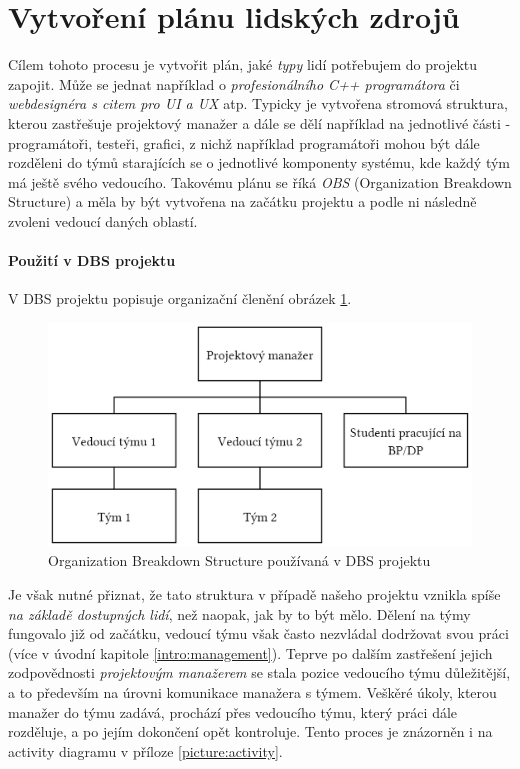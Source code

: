 
\section{Vytvoření plánu lidských zdrojů}

Cílem tohoto procesu je vytvořit plán, jaké \emph{typy} lidí potřebujem do projektu zapojit. Může se jednat například o \emph{profesionálního C++ programátora} či \emph{webdesignéra s citem pro UI a UX} atp. Typicky je vytvořena stromová struktura, kterou zastřešuje projektový manažer a dále se dělí například na jednotlivé části - programátoři, testeři, grafici, z nichž například programátoři mohou být dále rozděleni do týmů starajících se o jednotlivé komponenty systému, kde každý tým má ještě svého vedoucího. Takovému plánu se říká \emph{OBS} (Organization Breakdown Structure) a měla by být vytvořena na začátku projektu a podle ni následně zvoleni vedoucí daných oblastí.

\paragraph{Použití v DBS projektu}
V DBS projektu popisuje organizační členění obrázek \ref{picture:obs}.\\
\begin{figure}[h]
\includegraphics[width=\textwidth]{../pdf/dbs-obs.pdf}
\caption{Organization Breakdown Structure používaná v DBS projektu} \label{picture:obs}
\end{figure}
Je však nutné přiznat, že tato struktura v případě našeho projektu vznikla spíše \emph{na základě dostupných lidí}, než naopak, jak by to být mělo. Dělení na týmy fungovalo již od začátku, vedoucí týmu však často nezvládal dodržovat svou práci (více v úvodní kapitole \ref{intro:management}). Teprve po dalším zastřešení jejich zodpovědnosti \emph{projektovým manažerem} se stala pozice vedoucího týmu důležitější, a to především na úrovni komunikace manažera s týmem. Veškěré úkoly, kterou manažer do týmu zadává, prochází přes vedoucího týmu, který práci dále rozděluje, a po jejím dokončení opět kontroluje. Tento proces je znázorněn i na activity diagramu v příloze \ref{picture:activity}.

